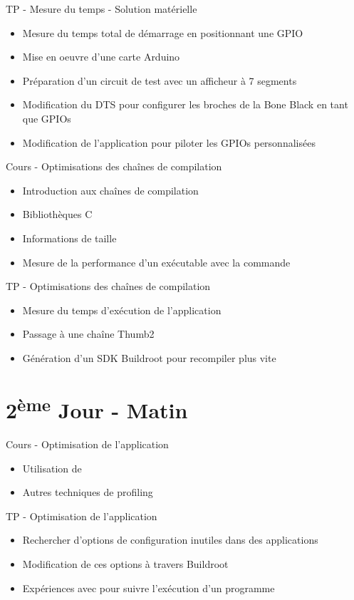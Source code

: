 \documentclass[a4paper,12pt,obeyspaces,spaces,hyphens]{article}
\begin{document}
\feagendatwocolumn
{TP - Mesure du temps - Solution matérielle}
{
  \begin{itemize}
  \item Mesure du temps total de démarrage en positionnant une GPIO
  \item Mise en oeuvre d'une carte Arduino
  \item Préparation d'un circuit de test avec un afficheur à 7 segments
  \item Modification du DTS pour configurer les broches de la Bone Black en tant que GPIOs
  \item Modification de l'application pour piloter les GPIOs personnalisées
  \end{itemize}
}
{Cours - Optimisations des chaînes de compilation}
{
  \begin{itemize}
  \item Introduction aux chaînes de compilation
  \item Bibliothèques C
  \item Informations de taille
  \item Mesure de la performance d'un exécutable avec la commande 
  \end{itemize}
}

\feagendaonecolumn
{TP - Optimisations des chaînes de compilation}
{
  \begin{itemize}
  \item Mesure du temps d'exécution de l'application
  \item Passage à une chaîne Thumb2
  \item Génération d'un SDK Buildroot pour recompiler plus vite
  \end{itemize}
}

\section{2\textsuperscript{ème} Jour - Matin}

\feagendatwocolumn
{Cours - Optimisation de l'application}
{
  \begin{itemize}
  \item Utilisation de 
  \item Autres techniques de profiling
  \end{itemize}
}
{TP - Optimisation de l'application}
{
 \begin{itemize}
 \item Rechercher d'options de configuration inutiles dans des applications
 \item Modification de ces options à travers Buildroot
 \item Expériences avec  pour suivre l'exécution d'un programme
 \end{itemize}
}
\end{document}
